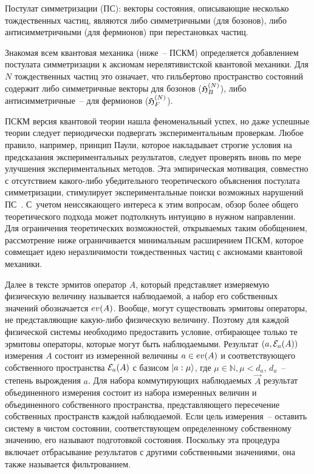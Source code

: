 \documentclass[a4paper, 12pt]{article}
\begin{document}
Постулат симметризации (ПС): векторы состояния, описывающие несколько 
тождественных частиц, являются либо симметричными (для бозонов), либо 
антисимметричными (для фермионов) при перестановках частиц.

Знакомая всем квантовая механика (ниже~-- ПСКМ) определяется добавлением 
постулата симметризации к аксиомам нерелятивистской квантовой механики. 
Для $N$ тождественных частиц это означает, что гильбертово пространство 
состояний содержит либо симметричные векторы для бозонов ($\mathfrak{H}^{(N)}_B$), 
либо антисимметричные~-- для фермионов ($\mathfrak{H}^{(N)}_F$).

ПСКМ версия квантовой теории нашла феноменальный успех, но даже успешные 
теории следует периодически подвергать экспериментальным проверкам. 
Любое правило, например, принцип Паули, которое накладывает строгие 
условия на предсказания экспериментальных результатов, следует проверять 
вновь по мере улучшения экспериментальных методов. Эта эмпирическая 
мотивация, совместно с отсутствием какого-либо убедительного 
теоретического объяснения постулата симметризации, стимулирует 
экспериментальные поиски возможных нарушений ПС~\cite{ref3, ref4, ref5, 
ref6, ref7, ref8, ref9, ref10}. %
С~учетом неиссякающего интереса к этим вопросам, обзор более общего 
теоретического подхода может подтолкнуть интуицию в нужном направлении. 
Для ограничения теоретических возможностей, открываемых таким 
обобщением, рассмотрение ниже ограничивается минимальным расширением 
ПСКМ, которое совмещает идею неразличимости тождественных частиц 
с аксиомами квантовой механики.

Далее в тексте эрмитов оператор $A$, который представляет измеряемую 
физическую величину называется наблюдаемой, а набор его собственных 
значений обозначается ${}{{ev}\!\left(A\right)}$. Вообще, могут существовать эрмитовы 
операторы, не представляющие какую-либо физическую величину. Поэтому для 
каждой физической системы необходимо предоставить условие, отбирающее 
только те эрмитовы операторы, которые могут быть наблюдаемыми. Результат 
$(a, {\mathcal{E}}_a(A))$ измерения $A$ состоит из измеренной величины $a \in 
{}{{ev}\!\left(A\right)}$ и соответствующего собственного пространства ${\mathcal{E}}_a(A)$ с базисом 
${\left|a:\mu\right\rangle}$, где $\mu \in \mathbb{N}, \mu < d_a$, $d_a$~-- степень 
вырождения $a$. Для набора коммутирующих наблюдаемых $\vec{A}$ результат 
объединенного измерения состоит из набора измеренных величин 
и объединенного собственного пространства, представляющего пересечение 
собственных пространств каждой наблюдаемой. Если цель измерения~-- 
оставить систему в чистом состоянии, соответствующем определенному 
собственному значению, его называют подготовкой состояния. Поскольку эта 
процедура включает отбрасывание результатов с другими собственными 
значениями, она также называется фильтрованием.
\end{document}
